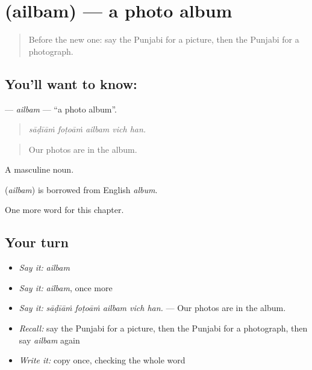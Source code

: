 \section[\texorpdfstring{\pa{ਐਲਬਮ} (ailbam)}{ਐਲਬਮ (ailbam)}]{ (ailbam) — a photo album}

\label{lesson:PA-C356-ailbam}



\begin{quote}
Before the new one: say the Punjabi for a picture, then the Punjabi for a photograph.
\end{quote}

\subsection*{You'll want to know: }
\textbf{} — \emph{ailbam} — \textquotedblleft{}a photo album\textquotedblright{}.

\begin{quote}
    
\end{quote}

\begin{quote}
\emph{sāḍīāṁ foṭoāṁ ailbam vich han.}
\end{quote}

\begin{quote}
Our photos are in the album.
\end{quote}

A masculine noun.

\begin{cousinweb}
\textbf{} (\emph{ailbam}) is borrowed from English \emph{album}.
\end{cousinweb}

\begin{grammarlens}[title={What you've built}]
One more word for this chapter.
\end{grammarlens}

\subsection*{Your turn}
\begin{itemize}
\raggedright
  \item \emph{Say it:} \emph{ailbam}
  \item \emph{Say it:} \emph{ailbam}, once more
  \item \emph{Say it:} \emph{sāḍīāṁ foṭoāṁ ailbam vich han.} — Our photos are in the album.
  \item \emph{Recall:} say the Punjabi for a picture, then the Punjabi for a photograph, then say \emph{ailbam} again
  \item \emph{Write it:} copy \textbf{} once, checking the whole word
\end{itemize}


